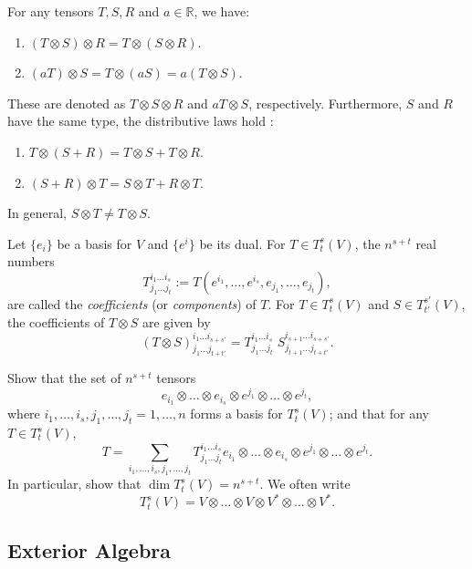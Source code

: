 \begin{remark}
For any tensors $T, S, R$ and $a \in \mathbb{R}$, we have:
\begin{enumerate}
\item $\left(T \otimes S \right) \otimes R = T \otimes \left(S \otimes R\right)$.
\item $\left(aT\right) \otimes S = T \otimes \left(a S \right) = a \left(T \otimes S\right)$.
\end{enumerate}
These are denoted as $T \otimes S \otimes R$ and $a T \otimes S$, respectively.
Furthermore, $S$ and $R$ have the same type, the distributive laws hold :
\begin{enumerate}
    \item $T \otimes (S + R) = T \otimes S + T \otimes R$.
    \item $(S+R) \otimes T = S \otimes T + R \otimes T$.
\end{enumerate}
\end{remark}

\begin{remark}
In general, $S \otimes T \neq T \otimes S$.
\end{remark}

Let $\{e_i \}$ be a basis for $V$ and $\{e^i\}$ be its dual.
For $T \in T_t^s(V)$, the $n^{s+t}$ real numbers
\[
T^{i_1 \dots i_s}_{j_1 \dots j_t}
:= T(e^{i_1}, \dots, e^{i_s}, e_{j_1}, \dots, e_{j_t}),
\]
are called the \emph{coefficients} (or \emph{components}) of $T$.
For $T \in T_t^s(V)$ and $S \in T_{t'}^{s'}(V)$, the coefficients of $T \otimes S$ are given by
\[
 (T\otimes S)^{i_1 \dots i_{s+s'}}_{j_1 \dots j_{t+t'} }
 = T^{i_1 \dots i_s}_{j_1 \dots j_t} \; S^{i_{s+1} \dots i_{s+s'}}_{j_{t+1} \dots j_{t+t'}}.
\]

\begin{problem}
Show that the set of $n^{s+t}$ tensors
\[
e_{i_1} \otimes \dots \otimes e_{i_s} \otimes e^{j_1} \otimes \dots \otimes e^{j_t},
\]
where $i_1, \dots, i_s, j_1, \dots, j_t = 1, \dots, n$ 
forms a basis for $T_t^s(V)$; and that for any $T \in T_t^s(V)$,
\[
T = \sum_{i_1, \dots, i_s, j_1, \dots, j_t} T_{j_1 \dots j_t}^{i_1 \dots i_s} e_{i_1} \otimes \dots \otimes e_{i_s} \otimes e^{j_1} \otimes \dots \otimes e^{j_t}.
\]
In particular, show that $\dim T_t^s(V) = n^{s+t}$. We often write 
\[
T_t^s(V) = V \otimes \dots \otimes V \otimes V^* \otimes \dots \otimes V^*.
\]
\end{problem}

\subsection{Exterior Algebra}

